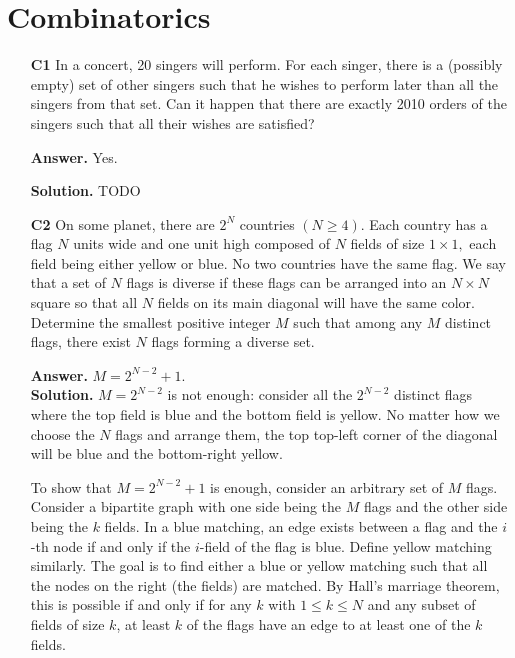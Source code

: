 \documentclass[11pt]{article}
\newcommand{\<}{\langle}
\renewcommand{\>}{\rangle}
\begin{document}
\section*{Combinatorics}
\begin{enumerate}
	\item [\textbf{C1}] In a concert, 20 singers will perform. For each singer, there is a (possibly empty) set of other singers such that he wishes to perform later than all the singers from that set. Can it happen that there are exactly 2010 orders of the singers such that all their wishes are satisfied?
	
	\textbf{Answer.} Yes. 
	
	\textbf{Solution.} TODO
	
	
	\item [\textbf{C2}] On some planet, there are $2^N$ countries $(N \geq 4).$ Each country has a flag $N$ units wide and one unit high composed of $N$ fields of size $1 \times 1,$ each field being either yellow or blue. No two countries have the same flag. We say that a set of $N$ flags is diverse if these flags can be arranged into an $N \times N$ square so that all $N$ fields on its main diagonal will have the same color. Determine the smallest positive integer $M$ such that among any $M$ distinct flags, there exist $N$ flags forming a diverse set.
	
	\textbf{Answer.} $M=2^{N-2}+1$. \\
	\textbf{Solution.} $M=2^{N-2}$ is not enough: consider all the $2^{N-2}$ distinct flags where the top field is blue and the bottom field is yellow. No matter how we choose the $N$ flags and arrange them, the top top-left corner of the diagonal will be blue and the bottom-right yellow. 
	
	To show that $M=2^{N-2}+1$ is enough, consider an arbitrary set of $M$ flags. 
	Consider a bipartite graph with one side being the $M$ flags and the other side being the $k$ fields. In a blue matching, an edge exists between a flag and the $i$-th node if and only if the $i$-field of the flag is blue. Define yellow matching similarly. The goal is to find either a blue or yellow matching such that all the nodes on the right (the fields) are matched. 
	By Hall's marriage theorem, this is possible if and only if for any $k$ with $1\le k\le N$ and any subset of fields of size $k$, at least $k$ of the flags have an edge to at least one of the $k$ fields. 
	

\end{enumerate}
\end{document}
